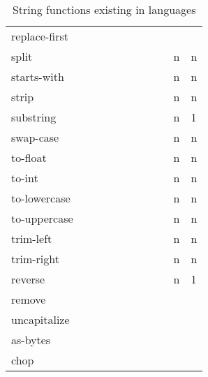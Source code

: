 \documentclass[anonymous,sigplan,review,11pt,nonacm,natbib=false]{acmart}
\begin{document}
\begin{table*}
\begin{tabular}{lllllllllll}
            replace-first &  &  &  &  &  &  &  &  &  & \\

            split &  &  &  &  &  & &  &  & n & n \\

            starts-with &  &  &  &  &  & &  &  & n & n \\

            strip &  &  &  &  &  & &  &  & n & n \\

            substring &  &  &  &  &  & &  &  & n & 1 \\

            swap-case &  &  &  &  &  & &  &  & n & n \\

            to-float &  &  &  &  &  & &  &  & n & n \\

            to-int &  &  &  &  &  & &  &  & n & n \\

            to-lowercase &  &  &  &  &  & &  &  & n & n \\

            to-uppercase &  &  &  &  &  & &  &  & n & n \\

            trim-left &  &  &  &  &  & &  &  & n & n \\

            trim-right &  &  &  &  &  & &  &  & n & n \\

            reverse &  &  &  &  &  & &  &  & n & 1 \\

            remove &  &  &  &  &  & &  &  &  & \\

            uncapitalize &  &  &  &  &  & &  &  &  & \\

            as-bytes &  &  &  &  &  & &  &  &  & \\

            chop &  &  &  &  &  & &  &  &  & \\ \hline
        \end{tabular}
        \caption{String functions existing in languages}
        \label{tab:my_label}
    \end{table*}

    \printbibliography
\end{document}
